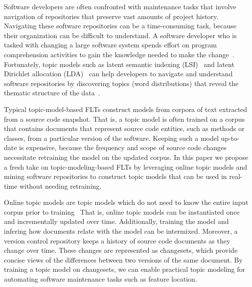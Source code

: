 
\begin{comment}
Points to make:

- Why FLTs matter
- What the problem is
- What our solution is
- How we evaluate it
- Contrib
- Organization
\end{comment}

Software developers are often confronted with maintenance tasks that involve navigation of repositories that preserve vast amounts of project history.
Navigating these software repositories can be a time-consuming task, because their organization can be difficult to understand.
A software developer who is tasked with changing a large software system spends effort on program comprehension activities to gain the knowledge needed to make the change~\cite{Corbi:1989}.
Fortunately, topic models such as
latent semantic indexing (LSI)~\cite{Deerwester:1990} and
latent Dirichlet allocation (LDA)~\cite{Blei-etal:2003}
can help developers to navigate and understand software repositories
by discovering topics (word distributions) that reveal the thematic structure of the data~\cite{Linstead-etal:2007,Thomas-etal:2011,Hindle_etal:2012}.

Typical topic-model-based FLTs construct models from corpora of text extracted from a source code snapshot.
That is, a topic model is often trained on a corpus that contains documents that
represent source code entities, such as methods or classes, from a particular version of the software.
Keeping such a model up-to-date is expensive,
because the frequency and scope of source code changes necessitate retraining the model on the updated corpus.
In this paper we propose a fresh take on topic-modeling-based FLTs
by leveraging online topic models and mining software repositories
to construct topic models that can be used in real-time without needing retraining.

Online topic models are topic models which do not need to know
the entire input corpus prior to training~\cite{Hoffman-etal:2010,Radim:2011}
That is, online topic models can be instantiated once and incrementally updated over time.
Additionally, training the model and infering how documents relate with the model
can be intermixed.
Moreover, a version control repository keeps a history of source code documents as they change over time.
These changes are represented as changesets,
which provide concise views of the differences between two versions of the same document.
By training a topic model on changesets, we can enable practical topic
modeling for automating software maintenance tasks such as feature
location.

